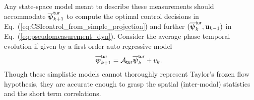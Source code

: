 \documentclass[a4paper,12pt]{article}
\newcommand{\0}{\mathsf{0}} %
\newcommand{\tur}{\mathsf{\tiny{tur}}}
\newcommand{\phivec}{{\boldsymbol{\psi}}}
\newcommand{\uvec}{{\mathbf{u}}}
\begin{document}
      Any state-space model meant
          to describe these measurements should accommodate  $\overline\phivec_{k+1}^\tur$ to
          compute the optimal control decisions in 
          Eq.~(\ref{eq:CSIcontrol_from_simple_projection}) and further 
          $(\overline\phivec_{k}^\tur,\uvec_{k-1})$ in
          Eq.~(\ref{eq:pseudomeasurement_dyn}). Consider
          the average phase
          temporal evolution if given by a
          first order
          auto-regressive model 
          \begin{equation}
            \overline{\phivec}^\tur_{k+1} = \mathcal{A}_{\tur} \overline{\phivec}^\tur_{k} + v_k.
          \end{equation}
          Though these simplistic models cannot thoroughly represent Taylor's frozen
          flow hypothesis, they are accurate enough to grasp the spatial
          (inter-modal) statistics and the short term correlations.
          
\end{document}
